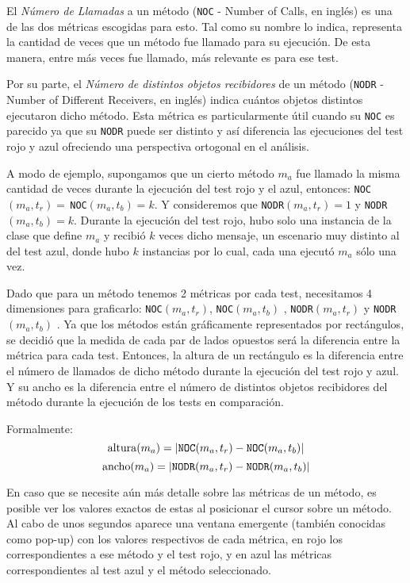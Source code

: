 \par El \emph{Número de Llamadas} a un método ({\tt NOC} - Number of Calls, en inglés) es una de las dos métricas escogidas para esto. Tal como su nombre lo indica, representa la cantidad de veces que un método fue llamado para su ejecución. De esta manera, entre más veces fue llamado, más relevante es para ese test.

\par Por su parte, el \emph{Número de distintos objetos recibidores} de un método ({\tt NODR} - Number of Different Receivers, en inglés) indica cuántos objetos distintos ejecutaron dicho método. Esta métrica es particularmente útil cuando su {\tt NOC} es parecido ya que su {\tt NODR} puede ser distinto y así diferencia las ejecuciones del test rojo y azul ofreciendo una perspectiva ortogonal en el análisis.

\par A modo de ejemplo, supongamos que un cierto método $m_a$ fue llamado la misma cantidad de veces durante la ejecución del test rojo y el azul, entonces: {\tt NOC}$(m_a,t_r) = \,${\tt NOC}$(m_a,t_b) = k$. Y consideremos que {\tt NODR}$(m_a,t_r) = 1$ y {\tt NODR}$(m_a,t_b) = k$. Durante la ejecución del test rojo, hubo solo una instancia de la clase que define $m_a$ y recibió $k$ veces dicho mensaje, un escenario muy distinto al del test azul, donde hubo $k$ instancias por lo cual, cada una ejecutó $m_a$ sólo una vez.

\par Dado que para un método tenemos 2 métricas por cada test, necesitamos 4 dimensiones para graficarlo: {\tt NOC}$(m_a,t_r)$, {\tt NOC}$(m_a,t_b)$ , {\tt NODR}$(m_a,t_r)$ y {\tt NODR}$(m_a,t_b)$ . Ya que los métodos están gráficamente representados por rectángulos, se decidió que la medida de cada par de lados opuestos será la diferencia entre la métrica para cada test. Entonces, la altura de un rectángulo es la diferencia entre el número de llamados de dicho método durante la ejecución del test rojo y azul. Y su ancho es la diferencia entre el número de distintos objetos recibidores del método durante la ejecución de los tests en comparación. 

\par Formalmente:
\[ {\rm altura}(m_a) = \vert {\tt NOC}(m_a,t_r) - {\tt NOC}(m_a,t_b) \vert \]
\[ {\rm ancho}(m_a) = \vert {\tt NODR}(m_a,t_r) - {\tt NODR}(m_a,t_b) \vert \]


\par En caso que se necesite aún más detalle sobre las métricas de un método, es posible ver los valores exactos de estas al posicionar el cursor sobre un método. Al cabo de unos segundos aparece una ventana emergente (también conocidas como pop-up) con los valores respectivos de cada métrica, en rojo los correspondientes a ese método y el test rojo, y en azul las métricas correspondientes al test azul y el método seleccionado.

